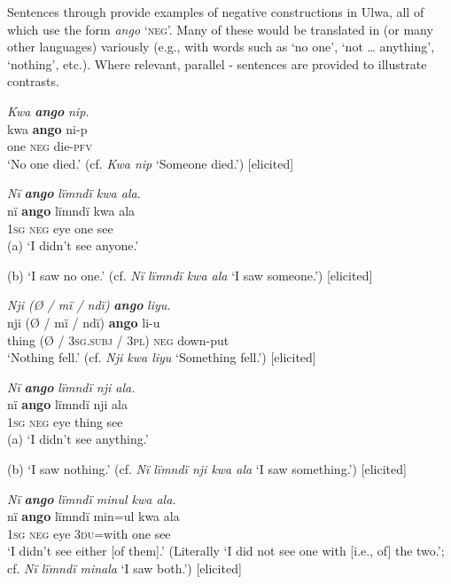 Sentences  through  provide examples of negative constructions in Ulwa, all of which use the form \textit{ango} ‘\textsc{neg}’. Many of these would be translated in  (or many other languages) variously (e.g., with words such as ‘no one’, ‘not … anything’, ‘nothing’, etc.). Where relevant, parallel - sentences are provided to illustrate contrasts.


\ea%
    \label{ex:syntax:120}
          \textit{Kwa} \textbf{\textit{ango}} \textit{nip.}\\
\gll    kwa  \textbf{ango}  ni-p\\
    one    \textsc{neg}  die-\textsc{pfv}\\
\glt `No one died.’ (cf. \textit{Kwa nip} ‘Someone died.’) [elicited]
\z

\ea%
    \label{ex:syntax:121}
          \textit{Nï} \textbf{\textit{ango}} \textit{lïmndï kwa ala.}\\
\gll    nï    \textbf{ango}  lïmndï  kwa  ala\\
    \textsc{1sg}  \textsc{neg}  eye    one    see\\
\glt    (a) ‘I didn’t see anyone.’

    (b) ‘I saw no one.’ (cf. \textit{Nï lïmndï kwa ala} ‘I saw someone.’) [elicited]
\z

\ea%
    \label{ex:syntax:122}
          \textit{Nji (Ø / mï / ndï)} \textbf{\textit{ango}} \textit{liyu.}\\
\gll    nji    (Ø / mï / ndï)      \textbf{ango}  li-u\\
    thing  (Ø / \textsc{3sg.subj} \textsc{/} \textsc{3pl)}  \textsc{neg}  down-put\\
\glt `Nothing fell.’ (cf. \textit{Nji kwa liyu} ‘Something fell.’) [elicited]
\z

\ea%
    \label{ex:syntax:123}
          \textit{Nï} \textbf{\textit{ango}} \textit{lïmndï nji ala.}\\
\gll    nï    \textbf{ango}  lïmndï  nji    ala\\
    \textsc{1sg}  \textsc{neg}  eye    thing  see\\
\glt    (a) ‘I didn’t see anything.’

    (b) ‘I saw nothing.’ (cf. \textit{Nï lïmndï nji kwa ala} ‘I saw something.’) [elicited]
\z

\ea%
    \label{ex:syntax:124}
          \textit{Nï} \textbf{\textit{ango}} \textit{lïmndï minul kwa ala.}\\
\gll    nï    \textbf{ango}  lïmndï  min=ul    kwa  ala\\
    \textsc{1sg}  \textsc{neg}  eye    \textsc{3du=}with  one    see\\
\glt `I didn’t see either [of them].’ (Literally ‘I did not see one with [i.e., of] the two.’; cf. \textit{Nï lïmndï minala} ‘I saw both.’) [elicited]
\z

